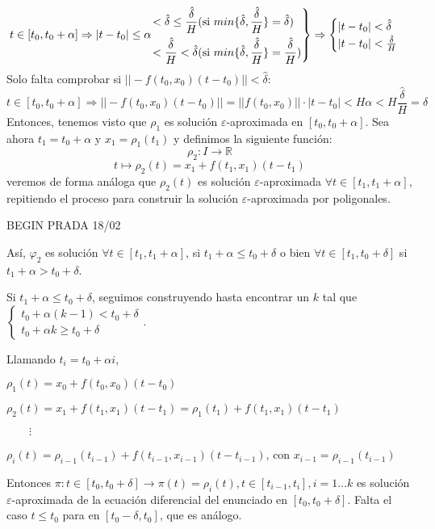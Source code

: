 \documentclass{article}
\makeatletter
\newenvironment{rcases}
{\left.\begin{aligned}}
	{\end{aligned}\right\rbrace}
\theoremstyle{theorem-style}  %
\theoremstyle{definition-style}
\theoremstyle{example-style}
\renewenvironment{proof}[1][\proofname]{\par
	\pushQED{\qed}%
	\normalfont \topsep6\p@\@plus6\p@\relax
	\list{}{%
		\settowidth{\leftmargin}{\quad:\hskip\labelsep}%
		\setlength{\labelwidth}{0pt}%
		\setlength{\itemindent}{-\leftmargin}%
	}%
	\item[\hskip\labelsep\itshape#1\@addpunct{:}]\ignorespaces
}{%
	\popQED\endlist\@endpefalse
}
\makeatother
\begin{document}
\begin{proof}
	\[ t \in [t_0, t_0+\alpha]\Rightarrow |t-t_0|\leq \alpha  
	\begin{rcases}
	< \hat{\delta}\leq\frac{\hat{\delta}}{H} \text{(si } min\{ \hat{\delta}, \frac{\hat{\delta}}{H}\}= \hat{\delta})\ \  \\
	< \frac{\hat{\delta}}{H}<\hat{\delta} \text{(si }  min\{ \hat{\delta}, \frac{\hat{\delta}}{H}\}=  \frac{\hat{\delta}}{H})
	\end{rcases}\Rightarrow \begin{cases}
	|t-t_0|<\hat{\delta}\\
	|t-t_0|<\frac{\hat{\delta}}{H}
	\end{cases}
	 \]
	 Solo falta comprobar si $ || -f(t_0,x_0)(t-t_0)||< \hat{\delta} $:	 
	  \[ t \in [t_0, t_0+\alpha]\Rightarrow ||-f(t_0,x_0)(t-t_0)|| = || f(t_0,x_0)||\cdot|t-t_0|<H\alpha < H \frac{\hat{\delta}}{H}= \hat{\delta}   \]
	Entonces, tenemos visto que $ \rho_1 $ es solución $ \varepsilon $-aproximada en $ [t_0,t_0+\alpha] $. Sea ahora $ t_1=t_0+\alpha $ y $ x_1=\rho_1(t_1) $ y definimos la siguiente función:
	\[ \rho_2:I\longrightarrow \mathbb{R} \]
	\[ t \longmapsto \rho_2(t)=x_1+f(t_1,x_1)(t-t_1) \]
	veremos de forma análoga que $ \rho_2(t) $ es solución $ \varepsilon $-aproximada $  \forall t \in [t_1,t_1+\alpha]  $, repitiendo el proceso para construir la solución $ \varepsilon $-aproximada por poligonales. 
	
	BEGIN PRADA 18/02
	
	Así, $ \varphi_2 $ es solución $ \forall t \in [t_1,t_1+\alpha] $, si $ t_1+\alpha\leq t_0+\delta $ o bien $\forall t \in [t_1, t_0+\delta] $ si $ t_1+\alpha >t_0+\delta $. 
	
	Si $ t_1+\alpha \leq t_0 +\delta $, seguimos construyendo hasta encontrar un $ k $ tal que $ \begin{cases}
	t_0+\alpha (k-1)<t_0+\delta\\
	t_0+\alpha k\geq t_0 +\delta
	\end{cases} $.
	
	Llamando $ t_i=t_0+\alpha i $,
	
	\begin{adjustwidth}{1cm}{}
		$ \rho_1(t)=x_0+f(t_0,x_0)(t-t_0) $
	
		$ \rho_2(t)=x_1+f(t_1,x_1)(t-t_1)=\rho_1(t_1)+f(t_1,x_1)(t-t_1) $
	
		$ \qquad \vdots $
	
		$\rho_i (t)=\rho_{i-1}(t_{i-1})+f(t_{i-1},x_{i-1})(t-t_{i-1})  $, con $ x_{i-1}=\rho_{i-1}(t_{i-1}) $
	\end{adjustwidth}

	Entonces $ \pi: t \in [t_0, t_0+\delta]\longrightarrow \pi(t)=\rho_i(t), t \in [t_{i-1}, t_i], i=1\dots k  $ es solución $ \varepsilon $-aproximada de la ecuación diferencial del enunciado en $ [t_0, t_0+\delta] $. Falta el caso $ t\leq t_0 $ para en $ [t_0-\delta, t_0] $, que es análogo.
\end{proof}
\end{document}
